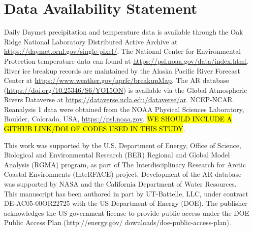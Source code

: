 \documentclass[12pts,draft]{AR_analysis_}
\begin{document}
%
%

\section*{Data Availability Statement}
Daily Daymet precipitation and temperature data is available through the Oak Ridge 
National Laboratory Distributed Active Archive at \url{https://daymet.ornl.gov/single-pixel/}.
The National Center for Environmental Protection temperature data can found at
\url{https://psl.noaa.gov/data/index.html}.
River ice breakup records are maintained by the Alaska Pacific River Forecast Center 
at \url{https://www.weather.gov/aprfc/breakupMap}. The AR database 
(\url{https://doi.org/10.25346/S6/YO15ON}) is available via the Global 
Atmospheric Rivers Dataverse at \url{https://dataverse.ucla.edu/dataverse/ar}.
NCEP-NCAR Reanalysis 1 data were obtained from the 
NOAA Physical Sciences Laboratory, Boulder, Colorado, USA, \url{https://psl.noaa.gov}.
\hl{WE SHOULD INCLUDE A GITHUB LINK/DOI OF CODES USED IN THIS STUDY}.


\acknowledgments
This work was supported by the U.S. Department of
Energy, Office of Science, Biological and Environmental Research (BER)
Regional and Global Model Analysis (RGMA) program, as part of The 
Interdisciplinary Research for Arctic Coastal Environments (InteRFACE) 
project. Development of the AR database was supported by NASA and the 
California Department of Water Resources. 
This manuscript has been authored in part by UT-Battelle, LLC, under contract
DE-AC05-00OR22725 with the US Department of Energy (DOE).
The publisher acknowledges the US government license to provide
public access under the DOE Public Access Plan (http://energy.gov/
downloads/doe-public-access-plan).

%
%

%



%
%
%
%
%
\end{document}
